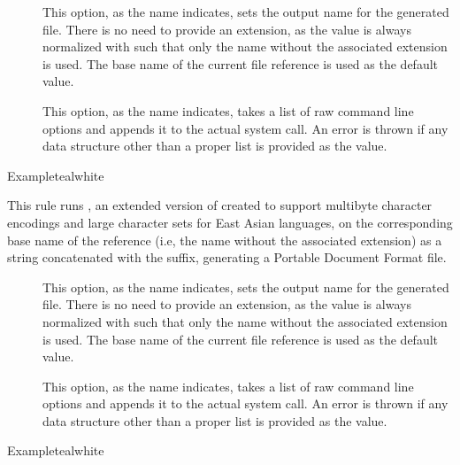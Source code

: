 \begin{description}
\begin{description}
\item[] This option, as the name indicates, sets the output name for the generated  file. There is no need to provide an extension, as the value is always normalized with  such that only the name without the associated extension is used. The base name of the current file reference is used as the default value.

\item[] This option, as the name indicates, takes a list of raw command line options and appends it to the actual system call. An error is thrown if any data structure other than a proper list is provided as the value.
\end{description}

\begin{codebox}{Example}{teal}{\icnote}{white}
\end{codebox}

\item[\rulebox{dvipdfmx}{Marco Daniel, Paulo Cereda}] This rule runs , an extended version of  created to support multibyte character encodings and large character sets for East Asian languages, on the corresponding base name of the  reference (i.e, the name without the associated extension) as a string concatenated with the  suffix, generating a Portable Document Format  file.

\begin{description}
\item[] This option, as the name indicates, sets the output name for the generated  file. There is no need to provide an extension, as the value is always normalized with  such that only the name without the associated extension is used. The base name of the current file reference is used as the default value.

\item[] This option, as the name indicates, takes a list of raw command line options and appends it to the actual system call. An error is thrown if any data structure other than a proper list is provided as the value.
\end{description}

\begin{codebox}{Example}{teal}{\icnote}{white}
\end{codebox}


\end{description}
